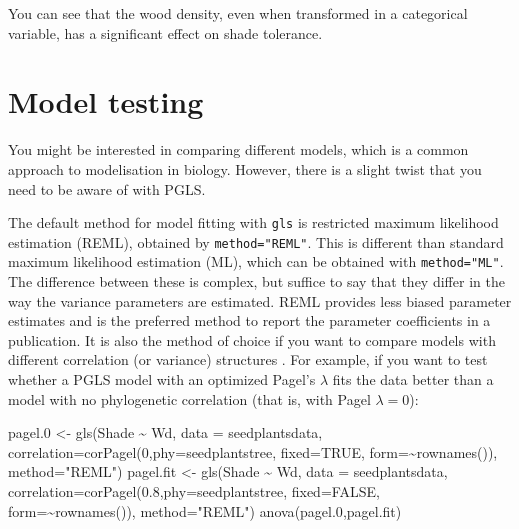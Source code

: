 \documentclass[
]{book}
\newenvironment{Shaded}{\begin{snugshade}}{\end{snugshade}}
\newcommand{\AttributeTok}[1]{\textcolor[rgb]{0.77,0.63,0.00}{#1}}
\newcommand{\ConstantTok}[1]{\textcolor[rgb]{0.00,0.00,0.00}{#1}}
\newcommand{\DecValTok}[1]{\textcolor[rgb]{0.00,0.00,0.81}{#1}}
\newcommand{\FloatTok}[1]{\textcolor[rgb]{0.00,0.00,0.81}{#1}}
\newcommand{\FunctionTok}[1]{\textcolor[rgb]{0.00,0.00,0.00}{#1}}
\newcommand{\NormalTok}[1]{#1}
\newcommand{\OtherTok}[1]{\textcolor[rgb]{0.56,0.35,0.01}{#1}}
\newcommand{\SpecialCharTok}[1]{\textcolor[rgb]{0.00,0.00,0.00}{#1}}
\newcommand{\StringTok}[1]{\textcolor[rgb]{0.31,0.60,0.02}{#1}}
\begin{document}
You can see that the wood density, even when transformed in a categorical variable, has a significant effect on shade tolerance.

\hypertarget{model-testing}{%
\chapter{Model testing}\label{model-testing}}

You might be interested in comparing different models, which is a common approach to modelisation in biology. However, there is a slight twist that you need to be aware of with PGLS.

The default method for model fitting with \texttt{gls} is restricted maximum likelihood estimation (REML), obtained by \texttt{method="REML"}. This is different than standard maximum likelihood estimation (ML), which can be obtained with \texttt{method="ML"}. The difference between these is complex, but suffice to say that they differ in the way the variance parameters are estimated. REML provides less biased parameter estimates and is the preferred method to report the parameter coefficients in a publication. It is also the method of choice if you want to compare models with different correlation (or variance) structures \citep{zuur2009mixed}. For example, if you want to test whether a PGLS model with an optimized Pagel's \(\lambda\) fits the data better than a model with no phylogenetic correlation (that is, with Pagel \(\lambda=0\)):

\begin{Shaded}
\begin{Highlighting}[]
\NormalTok{pagel}\FloatTok{.0} \OtherTok{\textless{}{-}} \FunctionTok{gls}\NormalTok{(Shade }\SpecialCharTok{\textasciitilde{}}\NormalTok{ Wd, }\AttributeTok{data =}\NormalTok{ seedplantsdata, }
               \AttributeTok{correlation=}\FunctionTok{corPagel}\NormalTok{(}\DecValTok{0}\NormalTok{,}\AttributeTok{phy=}\NormalTok{seedplantstree, }
                                    \AttributeTok{fixed=}\ConstantTok{TRUE}\NormalTok{, }\AttributeTok{form=}\SpecialCharTok{\textasciitilde{}}\FunctionTok{rownames}\NormalTok{()), }
               \AttributeTok{method=}\StringTok{"REML"}\NormalTok{)}
\NormalTok{pagel.fit }\OtherTok{\textless{}{-}} \FunctionTok{gls}\NormalTok{(Shade }\SpecialCharTok{\textasciitilde{}}\NormalTok{ Wd, }\AttributeTok{data =}\NormalTok{ seedplantsdata, }
                 \AttributeTok{correlation=}\FunctionTok{corPagel}\NormalTok{(}\FloatTok{0.8}\NormalTok{,}\AttributeTok{phy=}\NormalTok{seedplantstree, }
                                      \AttributeTok{fixed=}\ConstantTok{FALSE}\NormalTok{, }\AttributeTok{form=}\SpecialCharTok{\textasciitilde{}}\FunctionTok{rownames}\NormalTok{()),}
                 \AttributeTok{method=}\StringTok{"REML"}\NormalTok{)}
\FunctionTok{anova}\NormalTok{(pagel}\FloatTok{.0}\NormalTok{,pagel.fit)}
\end{Highlighting}
\end{Shaded}
\end{document}
